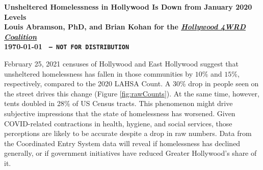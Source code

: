 \documentclass[11pt]{article}
\def\bfr{\bf\color{red}}
\def\resp{respectively}
\begin{document}

\begin{center}
	\Large\bf Unsheltered Homelessness in Hollywood Is Down from January 2020 Levels\\
	\vspace{1ex}
	{\normalsize\rm Louis Abramson, PhD, and Brian Kohan 
	for the \href{http://www.hollywood4wrd.live}{\it Hollywood 4WRD Coalition} \\ \today 
	{\bfr \texttt{ -- NOT FOR DISTRIBUTION}}}
\end{center}

 February 25, 2021 censuses of Hollywood and East Hollywood suggest that 
unsheltered homelessness has fallen in those communities by $10\%$ and $15\%$, \resp, compared to 
the 2020 LAHSA Count. A 30\% drop in people seen on the street drives this change 
(Figure \ref{fig:rawCounts}). At the same time, however, tents doubled in 28\% of US Census tracts. 
This phenomenon might drive subjective impressions that the state of homelessness has 
worsened. Given COVID-related contractions in health, hygiene, and social services, those 
perceptions are likely to be accurate despite a drop in raw numbers. 
Data from the Coordinated Entry System data will reveal if homelessness has declined 
generally, or if government initiatives have reduced Greater Hollywood's share of it.
\end{document}
